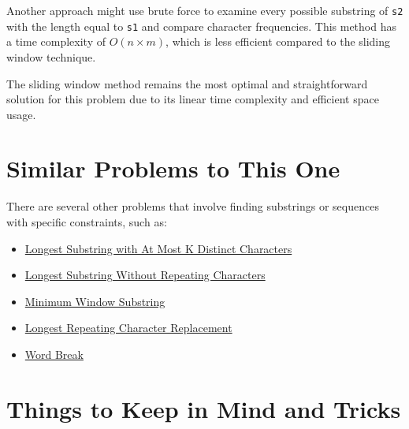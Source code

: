 Another approach might use brute force to examine every possible substring of \texttt{s2} with the length equal to \texttt{s1} and compare character frequencies. This method has a time complexity of \(O(n \times m)\), which is less efficient compared to the sliding window technique.

The sliding window method remains the most optimal and straightforward solution for this problem due to its linear time complexity and efficient space usage.

\section*{Similar Problems to This One}

There are several other problems that involve finding substrings or sequences with specific constraints, such as:

\begin{itemize}
    \item \hyperref[problem:longest_substring_with_at_most_k_distinct_characters]{Longest Substring with At Most K Distinct Characters}
    \item \hyperref[problem:longest_substring_without_repeating_characters]{Longest Substring Without Repeating Characters}
    \item \hyperref[problem:minimum_window_substring]{Minimum Window Substring}
    \item \hyperref[problem:longest_repeating_character_replacement]{Longest Repeating Character Replacement}
    \item \hyperref[problem:word_break]{Word Break}
\end{itemize}

\section*{Things to Keep in Mind and Tricks}

